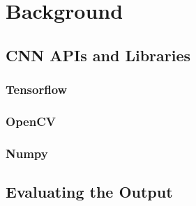 \chapter{Background}
\label{background}













\section{CNN APIs and Libraries}
\subsection*{Tensorflow}


\subsection*{OpenCV}

\subsection*{Numpy}

\section{Evaluating the Output}


